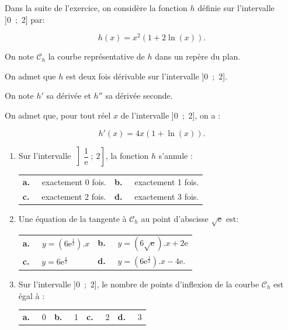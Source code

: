 Dans la suite de l'exercice, on considère la fonction $h$ définie sur l'intervalle ]0~;~2] par:

\[h(x) = x^2(1 + 2\ln (x)).\]

On note $\mathcal{C}_h$ la courbe représentative de $h$ dans un repère du plan. 

On admet que $h$ est deux fois dérivable sur l'intervalle ]0~;~2].

On note $h'$ sa dérivée et $h''$ sa dérivée seconde.

On admet que, pour tout réel $x$ de l'intervalle ]0~;~2], on a : 

\[h'(x) = 4x(1 + \ln (x)).\]

\begin{enumerate}[resume]
\item Sur l'intervalle $\left]\dfrac{1}{\text{e}}~;~2\right]$, la fonction $h$ s'annule :

\begin{center}
\begin{tabularx}{\linewidth}{*{2}{X}}
\textbf{a.~~} exactement 0 fois. &\textbf{b.~~}  exactement 1 fois.\\
\textbf{c.~~} exactement 2 fois. &\textbf{d.~~}  exactement 3 fois.
\end{tabularx}
\end{center}

\item Une équation de la tangente à $\mathcal{C}_h$ au point d'abscisse $\sqrt{\text{e}}$ est:

\begin{center}
\begin{tabularx}{\linewidth}{*{2}{X}}
\textbf{a.~~} $y = \left(6\text{e}^{\frac12}\right) .{} x $&
\textbf{b.~~} $y = \left(6\sqrt{\text{e}}\right).{} x + 2\text{e}$\\
\textbf{c.~~} $y = 6\text{e}^{\frac{x}{2}}$&\textbf{d.~~} $y = \left(6\text{e}^{\frac12}\right) .{} x - 4\text{e}$.
\end{tabularx}
\end{center}

\item Sur l'intervalle ]0~;~2], le nombre de points d'inflexion de la courbe $\mathcal{C}_h$ est égal à :

\begin{center}
\begin{tabularx}{\linewidth}{*{4}{X}}
\textbf{a.~~} 0&\textbf{b.~~} 1 &\textbf{c.~~} 2 &\textbf{d.~~}  3
\end{tabularx}
\end{center}


\end{enumerate}
